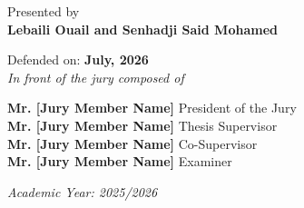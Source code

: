 \begin{titlepage}
\normalsize Presented by\\
{\normalsize \textbf{Lebaili Ouail and Senhadji Said Mohamed}}

\vspace{0.2cm}

{\normalsize Defended on: \textbf{July, 2026}}\\
{\normalsize \textit{In front of the jury composed of}}\\

\vspace{0.2cm}

\begin{center}
    {\normalsize \textbf{Mr. [Jury Member Name]} \hfill President of the Jury}\\
    {\normalsize \textbf{Mr. [Jury Member Name]} \hfill Thesis Supervisor}\\
    {\normalsize \textbf{Mr. [Jury Member Name]} \hfill Co-Supervisor}\\
    {\normalsize \textbf{Mr. [Jury Member Name]} \hfill Examiner}\\
\end{center}

\vspace{0.5cm}

\normalsize \textit{Academic Year: 2025/2026}
\end{titlepage}

